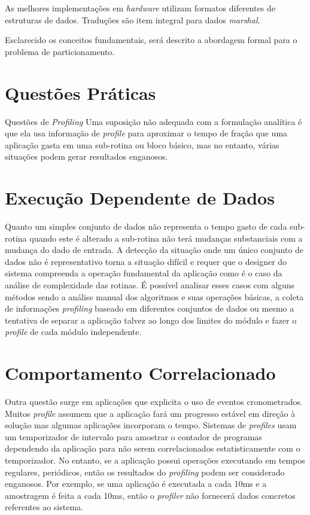 As melhores implementações em \textit{hardware} utilizam formatos diferentes de estruturas de dados. Traduções são item integral para dados \textit{marshal}.

Esclarecido os conceitos fundamentais, será descrito a abordagem formal para o problema de particionamento.

\section{Questões Práticas}
Questões de \textit{Profiling}
Uma suposição não adequada com a formulação analítica é que ela usa informação de \textit{profile} para aproximar o tempo de fração que uma aplicação gasta em uma sub-rotina ou bloco básico, mas no entanto, várias situações podem gerar resultados enganosos.

\section{Execução Dependente de Dados}
Quanto um simples conjunto de dados não representa o tempo gasto de cada sub-rotina quando este é alterado a sub-rotina não terá mudanças substanciais com a mudança do dado de entrada. A detecção da situação onde um único conjunto de dados não é representativo torna a situação difícil e requer que o designer do sistema compreenda a operação fundamental da aplicação como é o caso da análise de complexidade das rotinas. É possível analisar esses casos com alguns métodos sendo a análise manual dos algoritmos e suas operações básicas, a coleta de informações \textit{profiling} baseado em diferentes conjuntos de dados ou mesmo a tentativa de separar a aplicação talvez ao longo dos limites do módulo e fazer o \textit{profile} de cada módulo independente.

\section{Comportamento Correlacionado}
Outra questão surge em aplicações que explicita o uso de eventos cronometrados. Muitos \textit{profile} assumem que a aplicação fará um progresso estável em direção à solução mas algumas aplicações incorporam o tempo. Sistemas de \textit{profiles} usam um temporizador de intervalo para amostrar o contador de programas dependendo da aplicação para não serem correlacionados estatisticamente com o temporizador. No entanto, se a aplicação possui operações executando em tempos regulares, periódicos, então os resultados do \textit{profiling} podem ser considerado enganosos. Por exemplo, se uma aplicação é executada a cada 10ms e a amostragem é feita a cada 10ms, então o \textit{profiler} não fornecerá dados concretos referentes ao sistema.

